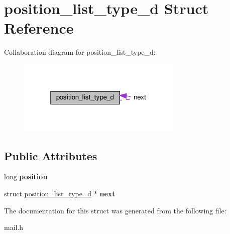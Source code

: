 \hypertarget{structposition__list__type__d}{}\section{position\+\_\+list\+\_\+type\+\_\+d Struct Reference}
\label{structposition__list__type__d}


Collaboration diagram for position\+\_\+list\+\_\+type\+\_\+d\+:\nopagebreak
\begin{figure}[H]
\begin{center}
\leavevmode
\includegraphics[width=223pt]{structposition__list__type__d__coll__graph}
\end{center}
\end{figure}
\subsection*{Public Attributes}
\begin{DoxyCompactItemize}
\item 
\mbox{\label{structposition__list__type__d_a94ceaa3fd177d4151e309a601d69a770}} 
long {\bfseries position}
\item 
\mbox{\label{structposition__list__type__d_a5cf586c39cb637e63cf6b7c9e7ca77d3}} 
struct \hyperlink{structposition__list__type__d}{position\+\_\+list\+\_\+type\+\_\+d} $\ast$ {\bfseries next}
\end{DoxyCompactItemize}


The documentation for this struct was generated from the following file\+:\begin{DoxyCompactItemize}
\item 
mail.\+h\end{DoxyCompactItemize}
